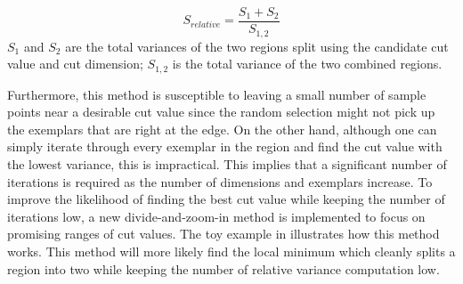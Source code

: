 \begin{equation}
S_{relative} = \frac{S_1+S_2}{S_{1,2}}
\end{equation}
$S_1$ and $S_2$ are the total variances of the two regions split using the candidate cut value and cut dimension; $S_{1,2}$ is the total variance of the two combined regions.

Furthermore, this method is susceptible to leaving a small number of sample points near a desirable cut value since the random selection might not pick up the exemplars that are right at the edge. On the other hand, although one can simply iterate through every exemplar in the region and find the cut value with the lowest variance, this is impractical. This implies that a significant number of iterations is required as the number of dimensions and exemplars increase. To improve the likelihood of finding the best cut value while keeping the number of iterations low, a new divide-and-zoom-in method is implemented to focus on promising ranges of cut values. The toy example in   illustrates how this method works. This method will more likely find the local minimum which cleanly splits a region into two while keeping the number of relative variance computation low. 

